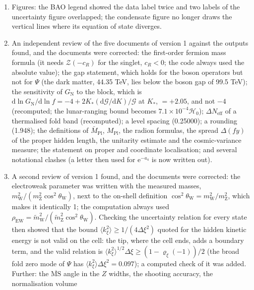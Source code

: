 \documentclass[
  10pt,
]{article}
\begin{document}
\begin{enumerate}
  explicit), as is the bound on the block rate today.
\item
  Figures: the BAO legend showed the data label twice and two labels of
  the uncertainty figure overlapped; the condensate figure no longer
  draws the vertical lines where its equation of state diverges.
\item
  An independent review of the five documents of version 1 against the
  outputs found, and the documents were corrected: the first-order
  fermion mass formula (it needs \(\mathcal{Z}(-c_R)\) for the singlet,
  \(c_R < 0\); the code always used the absolute value); the gap
  statement, which holds for the boson operators but not for \(\Psi\)
  (the dark matter, 44.35 TeV, lies below the boson gap of 99.5 TeV);
  the sensitivity of \(G_{\mathrm{N}}\) to the block, which is
  \(\mathrm{d}\ln G_{\mathrm{N}}/\mathrm{d}\ln f = -4 + 2K_*(\mathrm{d}\mathcal{G}/\mathrm{d}K)/\mathcal{G}\)
  at \(K_*\), \(= +2.05\), and not \(-4\) (recomputed; the lunar-ranging
  bound becomes \(7.1\times10^{-4}\mathcal{H}_0\));
  \(\Delta N_{\mathrm{eff}}\) of a thermalised fold band (recomputed); a
  level spacing (0.25000); a rounding (1.948); the definitions of
  \(\bar M_{\mathrm{Pl}}\), \(M_{\mathrm{Pl}}\), the radion formulas,
  the spread \(\Delta(fy)\) of the proper hidden length, the unitarity
  estimate and the cosmic-variance measure; the statement on proper and
  coordinate localisation; and several notational clashes (a letter then
  used for \(\mathrm{e}^{-a_4}\) is now written out).
\item
  A second review of version 1 found, and the documents were corrected:
  the electroweak parameter was written with the measured masses,
  \(m_{\mathrm{W}}^2/(m_{\mathrm{Z}}^2\cos^2\theta_{\mathrm{W}})\), next
  to the on-shell definition
  \(\cos^2\theta_{\mathrm{W}} = m_{\mathrm{W}}^2/m_{\mathrm{Z}}^2\),
  which makes it identically 1; the computation always used
  \(\rho_{\mathrm{EW}} = \tilde m_{\mathrm{W}}^2/(\tilde m_{\mathrm{Z}}^2\cos^2\theta_{\mathrm{W}})\).
  Checking the uncertainty relation for every state then showed that the
  bound \(\langle k_\xi^2\rangle \ge 1/(4\Delta\xi^2)\) quoted for the
  hidden kinetic energy is not valid on the cell: the tip, where the
  cell ends, adds a boundary term, and the valid relation is
  \(\langle k_\xi^2\rangle^{1/2}\Delta\xi \ge (1 - \varrho_\xi(-1))/2\)
  (the broad fold zero mode of \(\Psi\) has
  \(\langle k_\xi^2\rangle\Delta\xi^2 = 0.097\)); a computed check of it
  was added. Further: the \(\overline{\mathrm{MS}}\) angle in the \(Z\)
  widths, the shooting accuracy, the normalisation volume

\end{enumerate}
\end{document}
